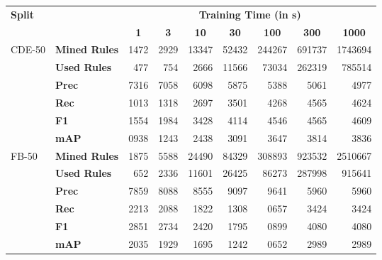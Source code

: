 \begin{tabular}{| l | l | r | r | r | r | r | r | r |}
    \hline

    \multirow{2}{*}{\textbf{Split}} &
    &
    \multicolumn{7}{|c|}{\textbf{Training Time (in s)}} \\

    &
    &
    \multicolumn{1}{|c|}{\textbf{1}} &
    \multicolumn{1}{|c|}{\textbf{3}} &
    \multicolumn{1}{|c|}{\textbf{10}} &
    \multicolumn{1}{|c|}{\textbf{30}} &
    \multicolumn{1}{|c|}{\textbf{100}} &
    \multicolumn{1}{|c|}{\textbf{300}} &
    \multicolumn{1}{|c|}{\textbf{1000}} \\

    \hline \hline

    \multirow{6}{*}{CDE-50}
    & \textbf{Mined Rules} & \num{1472}  & \num{2929} & \num{13347} & \num{52432}  & \num{244267}  & \num{691737}  & \num{1743694} \\
    & \textbf{Used Rules}  & \num{477}  & \num{754}  & \num{2666}  & \num{11566} & \num{73034} & \num{262319} & \num{785514}  \\
    & \textbf{Prec}        & 7316       & 7058       & 6098        & 5875        & 5388        & 5061        & 4977         \\
    & \textbf{Rec}         & 1013       & 1318       & 2697        & 3501        & 4268        & 4565        & 4624         \\
    & \textbf{F1}          & 1554       & 1984       & 3428        & 4114        & 4546        & 4565        & 4609         \\
    & \textbf{mAP}         & 0938       & 1243       & 2438        & 3091        & 3647        & 3814        & 3836         \\

    \hline

    \multirow{6}{*}{FB-50}
    & \textbf{Mined Rules} & \num{1875} & \num{5588} & \num{24490} & \num{84329}   & \num{308893} & \num{923532}  & \num{2510667} \\
    & \textbf{Used Rules}  & \num{652} & \num{2336} & \num{11601} & \num{26425}   & \num{86273}  & \num{287998} & \num{915641}\\
    & \textbf{Prec}        & 7859       & 8088       & 8555        & 9097        & 9641         & 5960        & 5960       \\
    & \textbf{Rec}         & 2213       & 2088       & 1822        & 1308        & 0657         & 3424        & 3424       \\
    & \textbf{F1}          & 2851       & 2734       & 2420        & 1795        & 0899         & 4080        & 4080       \\
    & \textbf{mAP}         & 2035       & 1929       & 1695        & 1242        & 0652         & 2989        & 2989       \\

    \hline
\end{tabular}
